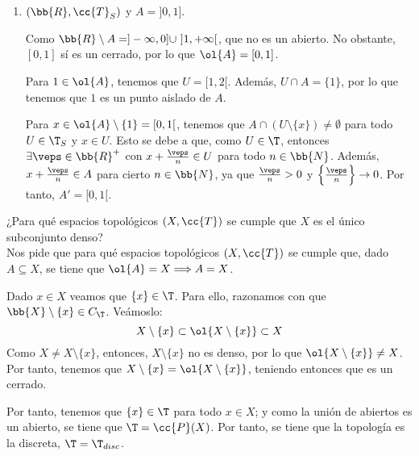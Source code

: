 \begin{ejercicio}
\begin{enumerate}
        
        \item $(\bb{R}, \cc{T}_S)$ y $A=]0,1]$.

        Como $\bb{R}\setminus A = ]-\infty, 0]\cup~]1,+\infty[$, que no es un abierto. No obstante, $[0,1]$ sí es un cerrado, por lo que $\ol{A}=[0,1]$.

        Para $1\in \ol{A}$, tenemos que $U=[1,2[$. Además, $U\cap A=\{1\}$, por lo que tenemos que $1$ es un punto aislado de $A$.

        Para $x\in \ol{A}\setminus \{1\}=[0,1[$, tenemos que $A\cap (U\setminus \{x\})\neq \emptyset$ para todo $U\in \T_S$ y $x\in U$. Esto se debe a que, como $U\in \T$, entonces $\exists \veps\in \bb{R}^+$ con $x+\frac{\veps}{n}\in U$ para todo $n\in \bb{N}$. Además, $x+\frac{\veps}{n}\in A$ para cierto $n\in \bb{N}$, ya que $\frac{\veps}{n}>0$ y $\left\{\frac{\veps}{n}\right\}\to 0$. Por tanto, $A'=[0,1[$.

        
    \end{enumerate}
\end{ejercicio}

\begin{ejercicio}
    ¿Para qué espacios topológicos $(X,\cc{T})$ se cumple que $X$ es el único subconjunto denso?\\

    Nos pide que para qué espacios topológicos $(X,\cc{T})$ se cumple que, dado $A\subseteq X$, se tiene que $\ol{A}=X\Longrightarrow A=X$.

    Dado $x\in X$ veamos que $\{x\}\in \T$. Para ello, razonamos con que $\bb{X}\setminus \{x\}\in C_\T$. Veámoslo:
    \begin{equation*}
        X\setminus \{x\} \subset \ol{X\setminus \{x\}} \subset X
    \end{equation*}
    Como $X\neq X\setminus \{x\}$, entonces, $X\setminus \{x\}$ no es denso, por lo que $\ol{X\setminus \{x\}}\neq X$. Por tanto, tenemos que $X\setminus \{x\}=\ol{X\setminus \{x\}}$, teniendo entonces que es un cerrado. 

    Por tanto, tenemos que $\{x\}\in \T$ para todo $x\in X$; y como la unión de abiertos es un abierto, se tiene que $\T=\cc{P}(X)$. Por tanto, se tiene que la topología es la discreta, $\T=\T_{disc}$.
\end{ejercicio}

